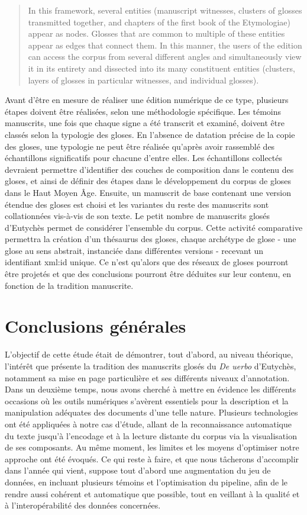 \documentclass[a4paper, twoside, 12pt]{book}
\begin{document}
\blockquote{In this framework, several entities (manuscript witnesses, clusters of glosses transmitted together, and chapters of the first book of the Etymologiae) appear as nodes. Glosses that are common to multiple of these entities appear as edges that connect them. In this manner, the users of the edition can access the corpus from several different angles and simultaneously view it in its entirety and dissected into its many constituent entities (clusters, layers of glosses in particular witnesses, and individual glosses).}

Avant d'être en mesure de réaliser une édition numérique de ce type, plusieurs étapes doivent être réalisées, selon une méthodologie spécifique. Les témoins manuscrits, une fois que chaque signe a été transcrit et examiné, doivent être classés selon la typologie des gloses. En l'absence de datation précise de la copie des gloses, une typologie ne peut être réalisée qu'après avoir rassemblé des échantillons significatifs pour chacune d'entre elles. Les échantillons collectés devraient permettre d'identifier des couches de composition dans le contenu des gloses, et ainsi de définir des étapes dans le développement du corpus de gloses dans le Haut Moyen Âge. Ensuite, un manuscrit de base contenant une version étendue des gloses est choisi et les variantes du reste des manuscrits sont collationnées vis-à-vis de son texte. Le petit nombre de manuscrits glosés d'Eutychès permet de considérer l'ensemble du corpus.  Cette activité comparative permettra la création d'un thésaurus des gloses, chaque \og{}archétype\fg{} de glose - une glose au sens abstrait, instanciée dans différentes versions - recevant un identifiant xml:id unique. Ce n'est qu'alors que des réseaux de gloses pourront être projetés et que des conclusions pourront être déduites sur leur contenu, en fonction de la tradition manuscrite. 


\section{Conclusions générales}

L'objectif de cette étude était de démontrer, tout d'abord, au niveau théorique, l'intérêt que présente la tradition des manuscrits glosés du \textit{De uerbo} d'Eutychès, notamment sa mise en page particulière et ses différents niveaux d'annotation. Dans un deuxième temps, nous avons cherché à mettre en évidence les différents occasions où les outils numériques s'avèrent essentiels pour la description et la manipulation adéquates des documents d'une telle nature. Plusieurs technologies ont été appliquées à notre cas d'étude, allant de la reconnaissance automatique du texte jusqu'à l'encodage et à la lecture distante du corpus via la visualisation de ses composants. Au même moment, les limites et les moyens d'optimiser notre approche ont été évoqués. Ce qui reste à faire, et que nous tâcherons d'accomplir dans l'année qui vient, suppose tout d'abord une augmentation du jeu de données, en incluant plusieurs témoins et l'optimisation du pipeline, afin de le rendre aussi cohérent et automatique que possible, tout en veillant à la qualité et à l'interopérabilité des données concernées.


\newpage
\nocite{*}
\printbibliography

\listoffigures
\end{document}
